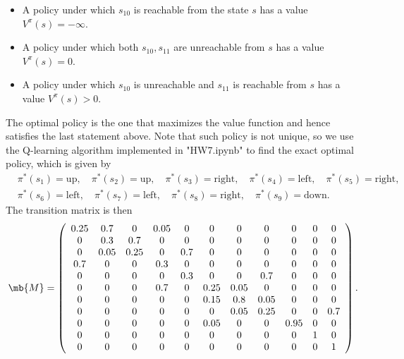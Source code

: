 \begin{exercise}
\begin{enumerate}
\begin{solution}
\begin{itemize}
                    \item A policy under which $s_{10}$ is reachable from the state $s$ has a value $V^\pi(s)=-\infty$.
                    \item A policy under which both $s_{10}, s_{11}$ are unreachable from $s$ has a value $V^\pi(s)=0$.
                    \item A policy under which $s_{10}$ is unreachable and $s_{11}$ is reachable from $s$ has a value $V^\pi(s)>0$.
                \end{itemize}
                The optimal policy is the one that maximizes the value function and hence satisfies the last statement above. Note that such policy is not unique, so we use the Q-learning algorithm implemented in "HW7.ipynb" to find the exact optimal policy, which is given by
                \begin{align*}
                     & \pi^*(s_1) = \text{up}, \quad \pi^*(s_2) = \text{up}, \quad \pi^*(s_3) = \text{right}, \quad \pi^*(s_4) = \text{left}, \quad \pi^*(s_5) = \text{right}, \\
                     & \pi^*(s_6) = \text{left}, \quad \pi^*(s_7) = \text{left}, \quad \pi^*(s_8) = \text{right}, \quad \pi^*(s_9) = \text{down}.
                \end{align*}
                The transition matrix is then
                \begin{align*}
                    \mb{M} = \left(\begin{array}{ccccccccccc}0.25 & 0.7 & 0 & 0.05 & 0 & 0 & 0 & 0 & 0 & 0 & 0\\0 & 0.3 & 0.7 & 0 & 0 & 0 & 0 & 0 & 0 & 0 & 0\\0 & 0.05 & 0.25 & 0 & 0.7 & 0 & 0 & 0 & 0 & 0 & 0\\0.7 & 0 & 0 & 0.3 & 0 & 0 & 0 & 0 & 0 & 0 & 0\\0 & 0 & 0 & 0 & 0.3 & 0 & 0 & 0.7 & 0 & 0 & 0\\0 & 0 & 0 & 0.7 & 0 & 0.25 & 0.05 & 0 & 0 & 0 & 0\\0 & 0 & 0 & 0 & 0 & 0.15 & 0.8 & 0.05 & 0 & 0 & 0\\0 & 0 & 0 & 0 & 0 & 0 & 0.05 & 0.25 & 0 & 0 & 0.7\\0 & 0 & 0 & 0 & 0 & 0.05 & 0 & 0 & 0.95 & 0 & 0\\0 & 0 & 0 & 0 & 0 & 0 & 0 & 0 & 0 & 1 & 0\\0 & 0 & 0 & 0 & 0 & 0 & 0 & 0 & 0 & 0 & 1\end{array}\right).
                \end{align*}

\end{solution}
\end{enumerate}
\end{exercise}

